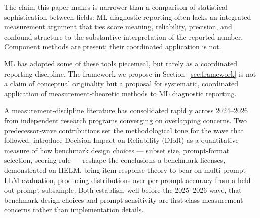 \documentclass[10pt]{article}
\begin{document}
The claim this paper makes is narrower than a comparison of
statistical sophistication between fields: ML diagnostic reporting
often lacks an integrated measurement argument that ties score
meaning, reliability, precision, and confound structure to the
substantive interpretation of the reported number. Component
methods are present; their coordinated application is not.

ML has adopted some of these tools piecemeal, but rarely as a
coordinated reporting discipline. The framework we propose in
Section~\ref{sec:framework} is not a claim of conceptual
originality but a proposal for systematic, coordinated
application of measurement-theoretic methods to ML diagnostic
reporting.

A measurement-discipline literature has consolidated rapidly across
2024--2026 from independent research programs converging on
overlapping concerns. Two predecessor-wave contributions set the
methodological tone for the wave that followed.
\citet{perlitz2024efficientbenchmarking} introduce Decision Impact
on Reliability (DIoR) as a quantitative measure of how benchmark
design choices --- subset size, prompt-format selection, scoring
rule --- reshape the conclusions a benchmark licenses, demonstrated
on HELM. \citet{polo2024promptevalUniverso} bring item response
theory to bear on multi-prompt LLM evaluation, producing
distributions over per-prompt accuracy from a held-out prompt
subsample. Both establish, well before the 2025--2026 wave, that
benchmark design choices and prompt sensitivity are first-class
measurement concerns rather than implementation details.
\end{document}
